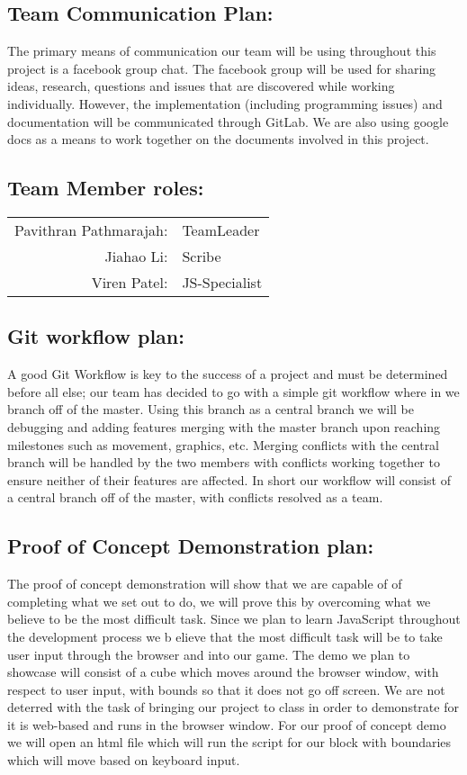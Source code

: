 \documentclass{article}
\begin{document}
\subsection*{Team Communication Plan:}  
The primary means of communication our
team will be using throughout this project is a facebook group chat. The
facebook group will be used for sharing ideas, research, questions and issues
that are discovered while working individually. However, the implementation
(including programming issues) and documentation will be communicated through
GitLab. We are also using google docs as a means to work together on the
documents involved in this project.

\subsection*{Team Member roles:}
\begin{table}[h!]     
	\begin{tabular}{r l}    
		Pavithran Pathmarajah: & TeamLeader\\   
		Jiahao Li: & Scribe\\   
		Viren Patel: & JS-Specialist
	\end{tabular}
\end{table}

	
	
\subsection*{Git workflow plan:}  
A good Git Workflow is key to the success of a
project and must be determined before all else; our team has decided to go with
a simple git workflow where in we branch off of the master. Using this branch as
a central branch we will be debugging and adding features merging with the
master branch upon reaching milestones such as movement, graphics, etc. Merging
conflicts with the central branch will be handled by the two members with
conflicts working together to ensure neither of their features are affected. In
short our workflow will consist of a central branch off of the master, with
conflicts resolved as a team.

\subsection*{Proof of Concept Demonstration plan:}  
The proof of concept
demonstration will show that we are capable of of completing what we set out to
do, we will prove this  by overcoming what we believe to be the most difficult
task. Since we plan to learn JavaScript throughout the development process we b
elieve that the most difficult task will be to take user input through the
browser and into our game. The demo we plan to showcase will consist of a cube
which moves around the browser window, with respect to user input, with bounds
so that it does not go off screen. We are not deterred  with the task of
bringing our project to class in order to demonstrate for it is web-based and
runs in the browser window. For our proof of concept demo we will open an html
file which will run the script for our block with boundaries which will move
based on keyboard input.
\end{document}
